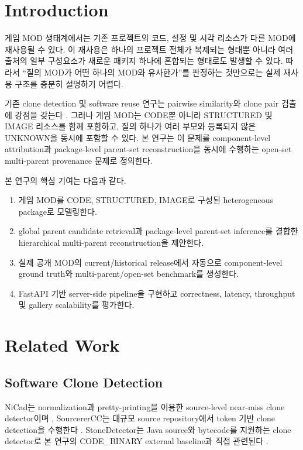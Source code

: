 \documentclass[runningheads]{llncs}
\begin{document}
\section{Introduction}

게임 MOD 생태계에서는 기존 프로젝트의 코드, 설정 및 시각 리소스가 다른
MOD에 재사용될 수 있다. 이 재사용은 하나의 프로젝트 전체가 복제되는
형태뿐 아니라 여러 출처의 일부 구성요소가 새로운 패키지 하나에 혼합되는
형태로도 발생할 수 있다. 따라서 ``질의 MOD가 어떤 하나의 MOD와 유사한가''를
판정하는 것만으로는 실제 재사용 구조를 충분히 설명하기 어렵다.

기존 clone detection 및 software reuse 연구는 pairwise similarity와 clone
pair 검출에 강점을 갖는다 \cite{nicad,sourcerercc,stonedetector}. 그러나
게임 MOD는 CODE뿐 아니라 STRUCTURED 및 IMAGE 리소스를 함께 포함하고,
질의 하나가 여러 부모와 등록되지 않은 UNKNOWN을 동시에 포함할 수 있다.
본 연구는 이 문제를 component-level attribution과 package-level parent-set
reconstruction을 동시에 수행하는 open-set multi-parent provenance 문제로
정의한다.

본 연구의 핵심 기여는 다음과 같다.
\begin{enumerate}
\item 게임 MOD를 CODE, STRUCTURED, IMAGE로 구성된 heterogeneous package로 모델링한다.
\item global parent candidate retrieval과 package-level parent-set inference를 결합한 hierarchical multi-parent reconstruction을 제안한다.
\item 실제 공개 MOD의 current/historical release에서 자동으로 component-level ground truth와 multi-parent/open-set benchmark를 생성한다.
\item FastAPI 기반 server-side pipeline을 구현하고 correctness, latency, throughput 및 gallery scalability를 평가한다.
\end{enumerate}

\section{Related Work}

\subsection{Software Clone Detection}

NiCad는 normalization과 pretty-printing을 이용한 source-level near-miss clone
detector이며 \cite{nicad}, SourcererCC는 대규모 source repository에서 token
기반 clone detection을 수행한다 \cite{sourcerercc}. StoneDetector는 Java
source와 bytecode를 지원하는 clone detector로 본 연구의 CODE\_BINARY
external baseline과 직접 관련된다 \cite{stonedetector}.
\end{document}
